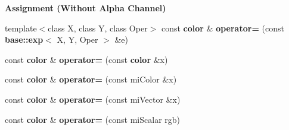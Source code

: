 \begin{Indent}{\bf Assignment (Without Alpha Channel)}\par
\begin{CompactItemize}
\item 
template$<$class X, class Y, class Oper$>$ const {\bf color} \& {\bf operator=} (const {\bf base::exp}$<$ X, Y, Oper $>$ \&e)
\item 
const {\bf color} \& {\bf operator=} (const {\bf color} \&x)
\item 
const {\bf color} \& {\bf operator=} (const mi\-Color \&x)
\item 
const {\bf color} \& {\bf operator=} (const mi\-Vector \&x)
\item 
const {\bf color} \& {\bf operator=} (const mi\-Scalar rgb)
\end{CompactItemize}
\end{Indent}
